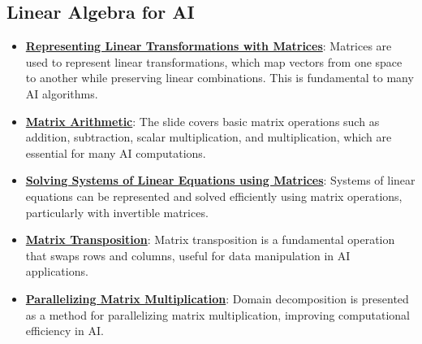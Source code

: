 \documentclass{article}%
\begin{document}
\subsection{Linear Algebra for AI}%
\label{subsec:LinearAlgebraforAI}%
\begin{itemize}[leftmargin=*]%
\item \href{https://purdue.brightspace.com/d2l/common/assets/pdfjs-d2l-dist/1.0.14-legacy/web/viewer.html?file=\%2Fcontent\%2Fenforced\%2F1095467-wl.202510.CS.24300.001\%2F04L1-Linear Algebra Primer.pdf\%3Fou\%3D1095467\&lang=en-us\&container=d2l-fileviewer-rendered-pdf\&fullscreen=d2l-fileviewer-rendered-pdf-dialog\&height=667#page=5}{\textbf{Representing Linear Transformations with Matrices}}: Matrices are used to represent linear transformations, which map vectors from one space to another while preserving linear combinations. This is fundamental to many AI algorithms.%
\item \href{https://purdue.brightspace.com/d2l/common/assets/pdfjs-d2l-dist/1.0.14-legacy/web/viewer.html?file=\%2Fcontent\%2Fenforced\%2F1095467-wl.202510.CS.24300.001\%2F04L1-Linear Algebra Primer.pdf\%3Fou\%3D1095467\&lang=en-us\&container=d2l-fileviewer-rendered-pdf\&fullscreen=d2l-fileviewer-rendered-pdf-dialog\&height=667#page=9}{\textbf{Matrix Arithmetic}}: The slide covers basic matrix operations such as addition, subtraction, scalar multiplication, and multiplication, which are essential for many AI computations.%
\item \href{https://purdue.brightspace.com/d2l/common/assets/pdfjs-d2l-dist/1.0.14-legacy/web/viewer.html?file=\%2Fcontent\%2Fenforced\%2F1095467-wl.202510.CS.24300.001\%2F04L1-Linear Algebra Primer.pdf\%3Fou\%3D1095467\&lang=en-us\&container=d2l-fileviewer-rendered-pdf\&fullscreen=d2l-fileviewer-rendered-pdf-dialog\&height=667#page=11}{\textbf{Solving Systems of Linear Equations using Matrices}}: Systems of linear equations can be represented and solved efficiently using matrix operations, particularly with invertible matrices.%
\item \href{https://purdue.brightspace.com/d2l/common/assets/pdfjs-d2l-dist/1.0.14-legacy/web/viewer.html?file=\%2Fcontent\%2Fenforced\%2F1095467-wl.202510.CS.24300.001\%2F04L1-Linear Algebra Primer.pdf\%3Fou\%3D1095467\&lang=en-us\&container=d2l-fileviewer-rendered-pdf\&fullscreen=d2l-fileviewer-rendered-pdf-dialog\&height=667#page=16}{\textbf{Matrix Transposition}}: Matrix transposition is a fundamental operation that swaps rows and columns, useful for data manipulation in AI applications.%
\item \href{https://purdue.brightspace.com/d2l/common/assets/pdfjs-d2l-dist/1.0.14-legacy/web/viewer.html?file=\%2Fcontent\%2Fenforced\%2F1095467-wl.202510.CS.24300.001\%2F04L1-Linear Algebra Primer.pdf\%3Fou\%3D1095467\&lang=en-us\&container=d2l-fileviewer-rendered-pdf\&fullscreen=d2l-fileviewer-rendered-pdf-dialog\&height=667#page=18}{\textbf{Parallelizing Matrix Multiplication}}: Domain decomposition is presented as a method for parallelizing matrix multiplication, improving computational efficiency in AI.%
\end{itemize}
\end{document}
